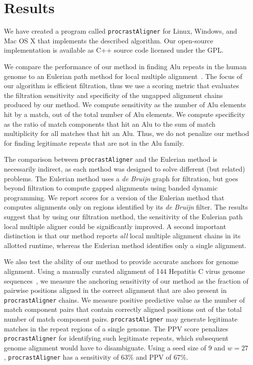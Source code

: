 \documentclass{llncs}
\begin{document}
\section{Results}
We have created a program called \texttt{procrastAligner} for Linux,
Windows, and Mac OS X that implements the described algorithm. Our
open-source implementation is available as C++ source code licensed
under the GPL.

We compare the performance of our method in finding Alu repeats in
the human genome to an Eulerian path method for local multiple
alignment~\cite{ref-related1}. The focus of our algorithm is
efficient filtration, thus we use a scoring metric that evaluates
the filtration sensitivity and specificity of the ungapped alignment
chains produced by our method. We compute sensitivity as the number
of Alu elements hit by a match, out of the total number of Alu
elements.  We compute specificity as the ratio of match components
that hit an Alu to the sum of match multiplicity for all matches
that hit an Alu.  Thus, we do not penalize our method for finding
legitimate repeats that are not in the Alu family.

The comparison between \texttt{procrastAligner} and the Eulerian
method is necessarily indirect, as each method was designed to
solve different (but related) problems.  The Eulerian method uses
a \textit{de Bruijn} graph for filtration, but goes beyond
filtration to compute gapped alignments using banded dynamic
programming. We report scores for a version of the Eulerian method
that computes alignments only on regions identified by its
\textit{de Bruijn} filter. The results suggest that by using our
filtration method, the sensitivity of the Eulerian path local
multiple aligner could be significantly improved.  A second
important distinction is that our method reports \emph{all} local
multiple alignment chains in its allotted runtime, whereas the
Eulerian method identifies only a single alignment.

We also test the ability of our method to provide accurate anchors
for genome alignment.  Using a manually curated alignment of 144
Hepatitis C virus genome sequences~\cite{ref-hcvdb}, we measure the
anchoring sensitivity of our method as the fraction of pairwise
positions aligned in the correct alignment that are also present in
\texttt{procrastAligner} chains.  We measure positive predictive
value as the number of match component pairs that contain correctly
aligned positions out of the total number of match component pairs.
\texttt{procrastAligner} may generate legitimate matches in the
repeat regions of a single genome.  The PPV score penalizes
\texttt{procrastAligner} for identifying such legitimate repeats,
which subsequent genome alignment would have to disambiguate.  Using
a seed size of $9$ and $w=27$, \texttt{procrastAligner} has a
sensitivity of 63\% and PPV of 67\%.
\begin{comment}
Setting the seed size to 7 and $w=45$ increases the sensitivity to
67\% while reducing PPV to 13\%. These scores were calculated on raw
procrastAligner output, without applying a an alignment score
threshold to discard poor alignments. We anticipate that removal of
low-scoring chains will significantly improve PPV.
\end{comment}
\end{document}
